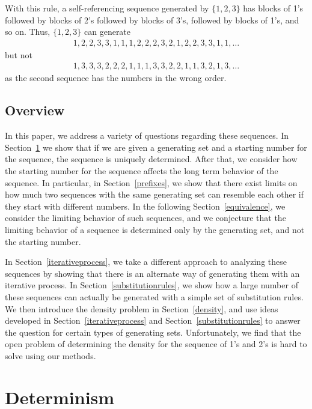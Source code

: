 \documentclass[runningheads,a4paper]{llncs}
\begin{document}
With this rule, a self-referencing sequence generated by $\{1,2,3\}$ has blocks of 1's followed by blocks of 2's followed by blocks of 3's, followed by blocks of 1's, and so on. Thus, $\{1,2,3\}$ can generate
\begin{align*}
1,2,2,3,3,1,1,1,2,2,2,3,2,1,2,2,3,3,1,1,\dots
\end{align*}
but not
\begin{align*}
1,3,3,3,2,2,2,1,1,1,3,3,2,2,1,1,3,2,1,3,\dots
\end{align*}
as the second sequence has the numbers in the wrong order.

\subsection{Overview}

In this paper, we address a variety of questions regarding these sequences. In Section~\ref{determinism} we show that if we are given a generating set and a starting number for the sequence, the sequence is uniquely determined. After that, we consider how the starting number for the sequence affects the long term behavior of the sequence. In particular, in Section~\ref{prefixes}, we show that there exist limits on how much two sequences with the same generating set can resemble each other if they start with different numbers. In the following Section~\ref{equivalence}, we consider the limiting behavior of such sequences, and we conjecture that the limiting behavior of a sequence is determined only by the generating set, and not the starting number. 

In Section~\ref{iterativeprocess}, we take a different approach to analyzing these sequences by showing that there is an alternate way of generating them with an iterative process. In Section~\ref{substitutionrules}, we show how a large number of these sequences can actually be generated with a simple set of substitution rules. We then introduce the density problem in Section~\ref{density}, and use ideas developed in Section~\ref{iterativeprocess} and Section~\ref{substitutionrules} to answer the question for certain types of generating sets. Unfortunately, we find that the open problem of determining the density for the sequence of 1's and 2's is hard to solve using our methods.

\section{Determinism}
\label{determinism}
\end{document}
